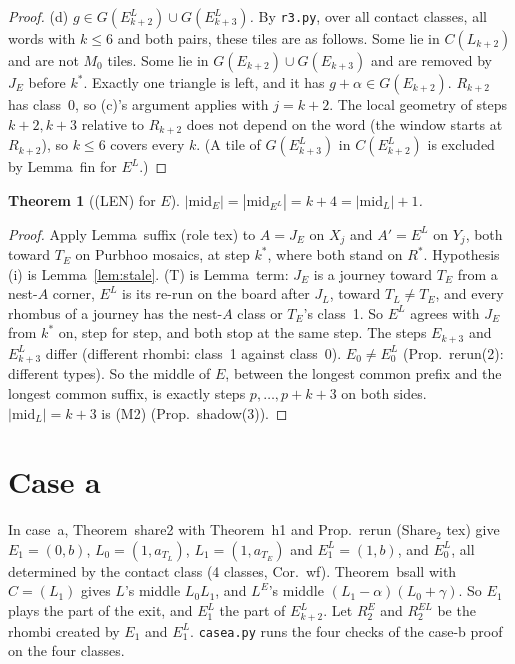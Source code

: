 \documentclass[11pt]{article}
\newtheorem{theorem}{Theorem}\newtheorem{lemma}[theorem]{Lemma}\newtheorem{proposition}[theorem]{Proposition}
\theoremstyle{remark}\newtheorem{remark}[theorem]{Remark}
\begin{document}
\begin{proof}
(d) \emph{$g\in G(E^L_{k+2})\cup G(E^L_{k+3})$.} By \texttt{r3.py}, over all contact classes, all words with $k\le6$ and both pairs, these tiles are as follows. Some lie in $C(L_{k+2})$ and are not $M_0$ tiles. Some lie in $G(E_{k+2})\cup G(E_{k+3})$ and are removed by $J_E$ before $k^*$. Exactly one triangle is left, and it has $g+\alpha\in G(E_{k+2})$. $R_{k+2}$ has class~0, so (c)'s argument applies with $j=k+2$. The local geometry of steps $k+2,k+3$ relative to $R_{k+2}$ does not depend on the word (the window starts at $R_{k+2}$), so $k\le6$ covers every $k$. (A tile of $G(E^L_{k+3})$ in $C(E^L_{k+2})$ is excluded by Lemma~fin for $E^L$.)
\end{proof}

\begin{theorem}[(LEN) for $E$]\label{thm:len}
$|\mathrm{mid}_E|=|\mathrm{mid}_{E^L}|=k+4=|\mathrm{mid}_L|+1$.
\end{theorem}
\begin{proof}
Apply Lemma~suffix (role tex) to $A=J_E$ on $X_j$ and $A'=E^L$ on $Y_j$, both toward $T_E$ on Purbhoo mosaics, at step $k^*$, where both stand on $R^*$. Hypothesis (i) is Lemma~\ref{lem:stale}. (T) is Lemma~term: $J_E$ is a journey toward $T_E$ from a nest-$A$ corner, $E^L$ is its re-run on the board after $J_L$, toward $T_L\ne T_E$, and every rhombus of a journey has the nest-$A$ class or $T_E$'s class~1. So $E^L$ agrees with $J_E$ from $k^*$ on, step for step, and both stop at the same step. The steps $E_{k+3}$ and $E^L_{k+3}$ differ (different rhombi: class~1 against class~0). $E_0\ne E^L_0$ (Prop.~rerun(2): different types). So the middle of $E$, between the longest common prefix and the longest common suffix, is exactly steps $p,\dots,p+k+3$ on both sides. $|\mathrm{mid}_L|=k+3$ is (M2) (Prop.~shadow(3)).
\end{proof}

\section{Case a}\label{sec:casea}
In case~a, Theorem~share2 with Theorem~h1 and Prop.~rerun (Share$_2$ tex) give $E_1=(0,b)$, $L_0=(1,a_{T_L})$, $L_1=(1,a_{T_E})$ and $E^L_1=(1,b)$, and $E^L_0$, all determined by the contact class (4 classes, Cor.~wf). Theorem~bsall with $C=(L_1)$ gives $L$'s middle $L_0L_1$, and $L^E$'s middle $(L_1-\alpha)(L_0+\gamma)$. So $E_1$ plays the part of the exit, and $E^L_1$ the part of $E^L_{k+2}$. Let $R^E_2$ and $R^{EL}_2$ be the rhombi created by $E_1$ and $E^L_1$. \texttt{casea.py} runs the four checks of the case-b proof on the four classes.
\end{document}

